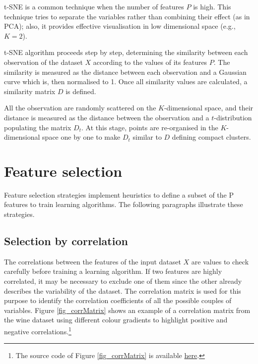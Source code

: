 t-SNE is a common technique when the number of features $P$ is high. This technique tries to separate the variables rather than combining their effect (as in PCA); also, it provides effective visualisation in low dimensional space (e.g., $K=2$).\par

t-SNE algorithm proceeds step by step, determining the similarity between each observation of the dataset $X$ according to the values of its features $P$. The similarity is measured as the distance between each observation and a Gaussian curve which is, then normalised to 1. Once all similarity values are calculated, a similarity matrix $D$ is defined.\par

All the observation are randomly scattered on the $K$-dimensional space, and their distance is measured as the distance between the observation and a $t$-distribution populating the matrix $D_t$. At this stage, points are re-organised in the $K$-dimensional space one by one to make $D_t$ similar to $D$ defining compact clusters.

\section{Feature selection}
Feature selection strategies implement heuristics to define a subset of the P features to train learning algorithms. The following paragraphs illustrate these strategies.

\subsection{Selection by correlation}
The correlations between the features of the input dataset $X$ are values to check carefully before training a learning algorithm. If two features are highly correlated, it may be necessary to exclude one of them since the other already describes the variability of the dataset. The correlation matrix is used for this purpose to identify the correlation coefficients of all the possible couples of variables. Figure \ref{fig_corrMatrix} shows an example of a correlation matrix from the wine dataset using different colour gradients to highlight positive and negative correlations.\footnote{The source code of Figure \ref{fig_corrMatrix} is available \href{https://github.com/aletuf93/logproj/blob/master/examples/05.\%20Dimensionality\%20Reduction.ipynb}{here}.}

